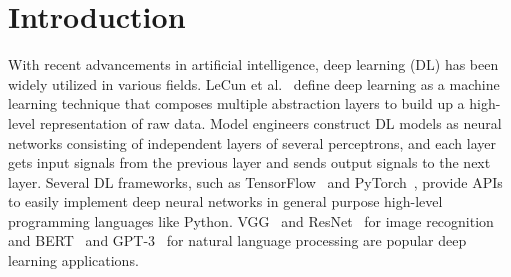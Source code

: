 \section{Introduction}\label{sec:intro}

With recent advancements in artificial intelligence, deep learning (DL) has
been widely utilized in various fields.
LeCun et al.~\cite{lecun2015deep} define deep learning as a machine learning
technique that composes multiple abstraction layers to build up a high-level
representation of raw data. 
Model engineers construct DL models as neural networks consisting of independent
layers of several perceptrons, and each layer gets input signals from the
previous layer and sends output signals to the next layer.
Several DL frameworks, such as TensorFlow~\cite{abadi2016tensorflow} and
PyTorch~\cite{pytorch2019}, provide APIs to easily implement deep neural
networks in general purpose high-level programming languages like Python.
VGG~\cite{simonyan2014very} and ResNet~\cite{he2016deep} for image recognition and
BERT~\cite{bert2018} and GPT-3~\cite{gpt32020} for natural language processing
are popular deep learning applications.


